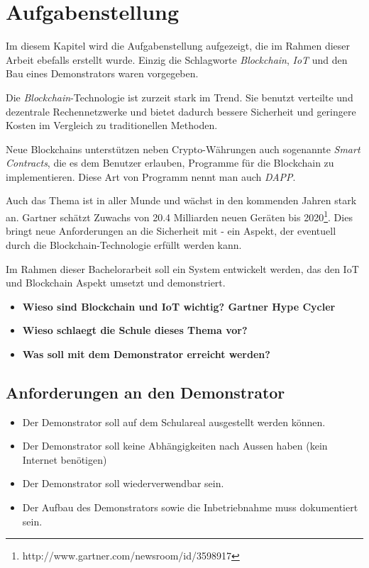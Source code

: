 \chapter{Aufgabenstellung}
\label{cha:Aufgabenstellung}

Im diesem Kapitel wird die Aufgabenstellung aufgezeigt, die im Rahmen dieser 
Arbeit ebefalls erstellt wurde. Einzig die Schlagworte \emph{Blockchain},
\emph{\acrfull{IoT}} und den Bau eines Demonstrators waren vorgegeben.

Die \emph{Blockchain}-Technologie ist zurzeit stark im Trend. Sie benutzt verteilte
und dezentrale Rechennetzwerke und bietet dadurch bessere Sicherheit und geringere 
Kosten im Vergleich zu traditionellen Methoden.

Neue Blockchains unterstützen neben Crypto-Währungen auch sogenannte \emph{Smart Contracts},
die es dem Benutzer erlauben, Programme für die Blockchain zu implementieren. Diese
Art von Programm nennt man auch \emph{\acrfull{DAPP}}.

Auch das Thema  ist in aller Munde und wächst in den kommenden Jahren stark an. Gartner 
schätzt Zuwachs von 20.4 Milliarden neuen Geräten bis 2020\footnote{http://www.gartner.com/newsroom/id/3598917}. Dies bringt neue Anforderungen an
die Sicherheit mit - ein Aspekt, der eventuell durch die Blockchain-Technologie erfüllt
werden kann.

Im Rahmen dieser Bachelorarbeit soll ein System entwickelt werden, das den IoT und Blockchain Aspekt
umsetzt und demonstriert.

\begin{itemize}
    \item \textbf{ Wieso sind Blockchain und IoT wichtig? Gartner Hype Cycler}
    \item \textbf{ Wieso schlaegt die Schule dieses Thema vor? }
    \item \textbf{ Was soll mit dem Demonstrator erreicht werden? }
\end{itemize}

\section{Anforderungen an den Demonstrator}
\label{sec:Anforderungen an den Demonstrator}
\begin{itemize}
    \item Der Demonstrator soll auf dem Schulareal ausgestellt werden können. 
    \item Der Demonstrator soll keine Abhängigkeiten nach Aussen haben (kein Internet benötigen)
    \item Der Demonstrator soll wiederverwendbar sein.
    \item Der Aufbau des Demonstrators sowie die Inbetriebnahme muss dokumentiert sein.
\end{itemize}

